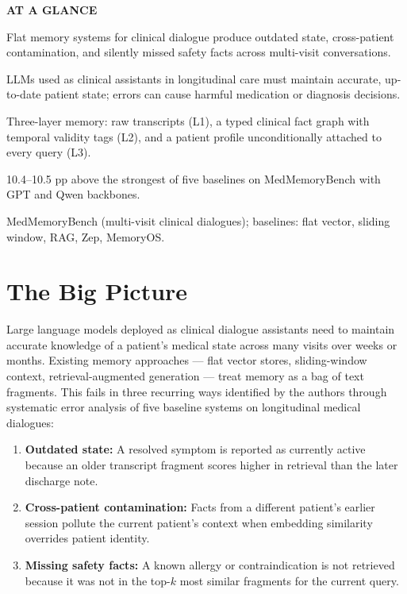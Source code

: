 \documentclass[10pt,twocolumn]{article}
\begin{document}
\begin{mdframed}[backgroundcolor=boxgray,linecolor=rulered,linewidth=1pt,
    innerleftmargin=6pt,innerrightmargin=6pt,
    innertopmargin=6pt,innerbottommargin=6pt]
\textbf{\small AT A GLANCE}\par\vspace{4pt}
\begin{description}[leftmargin=0pt,labelsep=4pt,itemsep=2pt,parsep=0pt,
    font=\small\bfseries]
  \item[Problem:] Flat memory systems for clinical dialogue produce
    outdated state, cross-patient contamination, and silently missed
    safety facts across multi-visit conversations.
  \item[Why it matters:] LLMs used as clinical assistants in
    longitudinal care must maintain accurate, up-to-date patient
    state; errors can cause harmful medication or diagnosis decisions.
  \item[Method:] Three-layer memory: raw transcripts (L1), a typed
    clinical fact graph with temporal validity tags (L2), and a
    patient profile unconditionally attached to every query (L3).
  \item[Result:] 10.4--10.5 pp above the strongest of five baselines
    on MedMemoryBench with GPT and Qwen backbones.
  \item[Evidence:] MedMemoryBench (multi-visit clinical dialogues);
    baselines: flat vector, sliding window, RAG, Zep, MemoryOS.
\end{description}
\end{mdframed}

\section{The Big Picture}

Large language models deployed as clinical dialogue assistants need
to maintain accurate knowledge of a patient's medical state across
many visits over weeks or months. Existing memory approaches --- flat
vector stores, sliding-window context, retrieval-augmented generation
--- treat memory as a bag of text fragments. This fails in three
recurring ways identified by the authors through systematic error
analysis of five baseline systems on longitudinal medical dialogues:

\begin{enumerate}[itemsep=2pt,parsep=0pt]
  \item \textbf{Outdated state:} A resolved symptom is reported as
    currently active because an older transcript fragment scores
    higher in retrieval than the later discharge note.
  \item \textbf{Cross-patient contamination:} Facts from a different
    patient's earlier session pollute the current patient's context
    when embedding similarity overrides patient identity.
  \item \textbf{Missing safety facts:} A known allergy or
    contraindication is not retrieved because it was not in the
    top-$k$ most similar fragments for the current query.
\end{enumerate}
\end{document}
